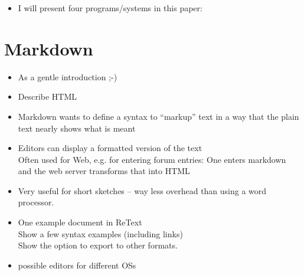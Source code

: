 \documentclass[../../LilyPond-Tutorials]{subfiles}
\begin{document}
\begin{itemize}
\item I will present four programs/systems in this paper:
\end{itemize}

\chapter{Markdown}

\begin{itemize}
\item As a gentle introduction ;-)
\item Describe HTML
\item Markdown wants to define a syntax to “markup” text in a way that the plain text nearly shows what is meant
\item Editors can display a formatted version of the text\\
Often used for Web, e.g. for entering forum entries: One enters markdown and the web server transforms that into HTML
\item Very useful for short sketches -- way less overhead than using a word processor.
\item One example document in ReText\\
Show a few syntax examples (including links)\\
Show the option to export to other formats.
\item possible editors for different OSs
\end{itemize}
\end{document}
